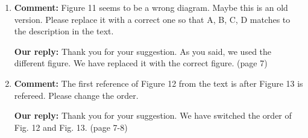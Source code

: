 \documentclass{article}
\begin{document}
\begin{enumerate}

\item \begin{flushleft}
    \textbf{Comment:}
Figure 11 seems to be a wrong diagram.
Maybe this is an old version.
Please replace it with a correct one so that A, B, C, D matches to the description in the text.
  \end{flushleft}

  \begin{flushleft}
    \textbf{Our reply:}
Thank you for your suggestion.
As you said, we used the different figure.
We have replaced it with the correct figure. (page 7)
  \end{flushleft}


\item \begin{flushleft}
    \textbf{Comment:}
The first reference of Figure 12 from the text is after Figure 13 is refereed.
Please change the order.
  \end{flushleft}

  \begin{flushleft}
    \textbf{Our reply:}
Thank you for your suggestion.
We have switched the order of Fig. 12 and Fig. 13. (page 7-8)
  \end{flushleft}


\end{enumerate}
\end{document}
